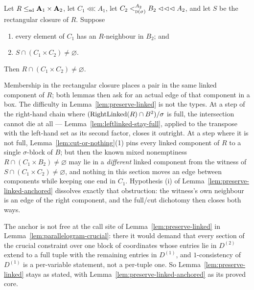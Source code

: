 \begin{lemma}\label{lem:preserve-linked-anchored}
Let $R\sdle\mathbf A_{1}\times\mathbf A_{2}$, let $C_{1}\lll A_{1}$, let
$C_{2}\subt[A_{2}]{\TD(\sigma)}B_{2}\lll A_{2}$, and let $S$ be the
rectangular closure of $R$. Suppose
\begin{enumerate}\romanlabels\tightlist
\item every element of $C_{1}$ has an $R$-neighbour in $B_{2}$; and
\item $S\cap(C_{1}\times C_{2})\neq\varnothing$.
\end{enumerate}
Then $R\cap(C_{1}\times C_{2})\neq\varnothing$.
\end{lemma}

\begin{hazard}\label{haz:preserve-anchor}
Membership in the rectangular closure places a pair in the same linked
component of $R$; both lemmas then ask for an actual edge of that component
in a box. The difficulty in Lemma~\ref{lem:preserve-linked} is not the
types. At a step of the right-hand chain where
$(\RightLinked(R)\cap B^{2})/\sigma$ is full, the intersection cannot die at
all --- Lemma~\ref{lem:leftlinked-stay-full}, applied to the transpose with
the left-hand set as its second factor, closes it outright. At a step where
it is not full, Lemma~\ref{lem:cut-or-nothing}(1) pins every linked
component of $R$ to a single $\sigma$-block of $B$; but then the known mixed
nonemptiness $R\cap(C_{1}\times B_{2})\neq\varnothing$ may lie in a
\emph{different} linked component from the witness of
$S\cap(C_{1}\times C_{2})\neq\varnothing$, and nothing in this section moves
an edge between components while keeping one end in $C_{1}$. Hypothesis (i)
of Lemma~\ref{lem:preserve-linked-anchored} dissolves exactly that
obstruction: the witness's own neighbour is an edge of the right component,
and the full/cut dichotomy then closes both ways.

The anchor is not free at the call site of Lemma~\ref{lem:preserve-linked}
in Lemma~\ref{lem:parallelogram-crucial}: there it would demand that every
section of the crucial constraint over one block of coordinates whose
entries lie in $D^{(2)}$ extend to a full tuple with the remaining entries
in $D^{(1)}$, and $1$-consistency of $D^{(1)}$ is a per-variable statement,
not a per-tuple one. So Lemma~\ref{lem:preserve-linked} stays as stated,
with Lemma~\ref{lem:preserve-linked-anchored} as its proved core.
\end{hazard}


